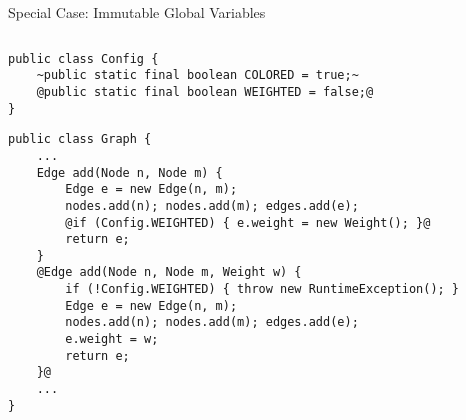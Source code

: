 \begin{frame}[fragile]{Special Case: Immutable Global Variables}
		\begin{columns}
\begin{tiny}
\begin{lstlisting}
public class Config {
	~public static final boolean COLORED = true;~
	@public static final boolean WEIGHTED = false;@
}
\end{lstlisting}
\begin{lstlisting}
public class Graph {
	...
	Edge add(Node n, Node m) {
		Edge e = new Edge(n, m);
		nodes.add(n); nodes.add(m); edges.add(e);
		@if (Config.WEIGHTED) { e.weight = new Weight(); }@
		return e;
	}
	@Edge add(Node n, Node m, Weight w) {
		if (!Config.WEIGHTED) { throw new RuntimeException(); }
		Edge e = new Edge(n, m);
		nodes.add(n); nodes.add(m); edges.add(e);
		e.weight = w;
		return e;
	}@
	...
}
\end{lstlisting}
\end{tiny}	
		\end{columns}
\end{frame}

